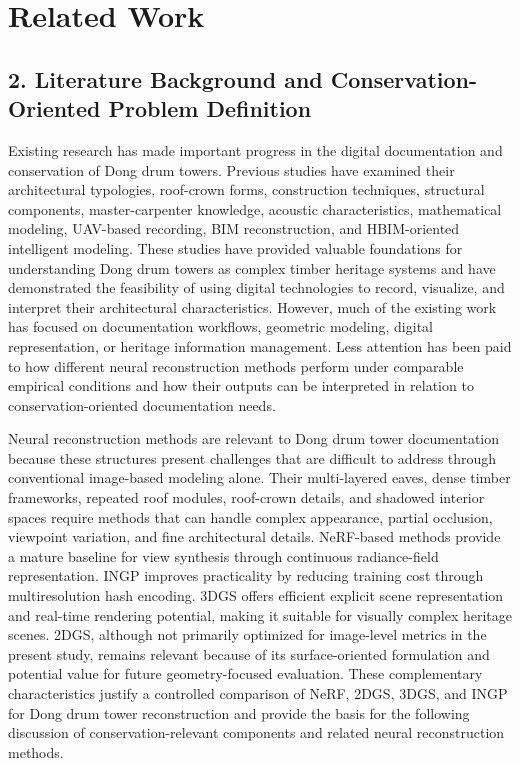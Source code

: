 \section{Related Work}\label{sec:Research_Background}

\subsection{\texorpdfstring{\textbf{2. Literature Background and
Conservation-Oriented Problem
Definition}}{2. Literature Background and Conservation-Oriented Problem 
Definition}}\label{literature-background-and-conservation-oriented-problem-definition}

Existing research has made important progress in the digital
documentation and conservation of Dong drum towers. Previous studies
have examined their architectural typologies, roof-crown forms,
construction techniques, structural components, master-carpenter
knowledge, acoustic characteristics, mathematical modeling, UAV-based
recording, BIM reconstruction, and HBIM-oriented intelligent modeling.
These studies have provided valuable foundations for understanding Dong
drum towers as complex timber heritage systems and have demonstrated the
feasibility of using digital technologies to record, visualize, and
interpret their architectural characteristics. However, much of the
existing work has focused on documentation workflows, geometric
modeling, digital representation, or heritage information management.
Less attention has been paid to how different neural reconstruction
methods perform under comparable empirical conditions and how their
outputs can be interpreted in relation to conservation-oriented
documentation needs.

Neural reconstruction methods are relevant to Dong drum tower
documentation because these structures present challenges that are
difficult to address through conventional image-based modeling alone.
Their multi-layered eaves, dense timber frameworks, repeated roof
modules, roof-crown details, and shadowed interior spaces require
methods that can handle complex appearance, partial occlusion, viewpoint
variation, and fine architectural details. NeRF-based methods provide a
mature baseline for view synthesis through continuous radiance-field
representation. INGP improves practicality by reducing training cost
through multiresolution hash encoding. 3DGS offers efficient explicit
scene representation and real-time rendering potential, making it
suitable for visually complex heritage scenes. 2DGS, although not
primarily optimized for image-level metrics in the present study,
remains relevant because of its surface-oriented formulation and
potential value for future geometry-focused evaluation. These
complementary characteristics justify a controlled comparison of NeRF,
2DGS, 3DGS, and INGP for Dong drum tower reconstruction and provide the
basis for the following discussion of conservation-relevant components
and related neural reconstruction methods.

